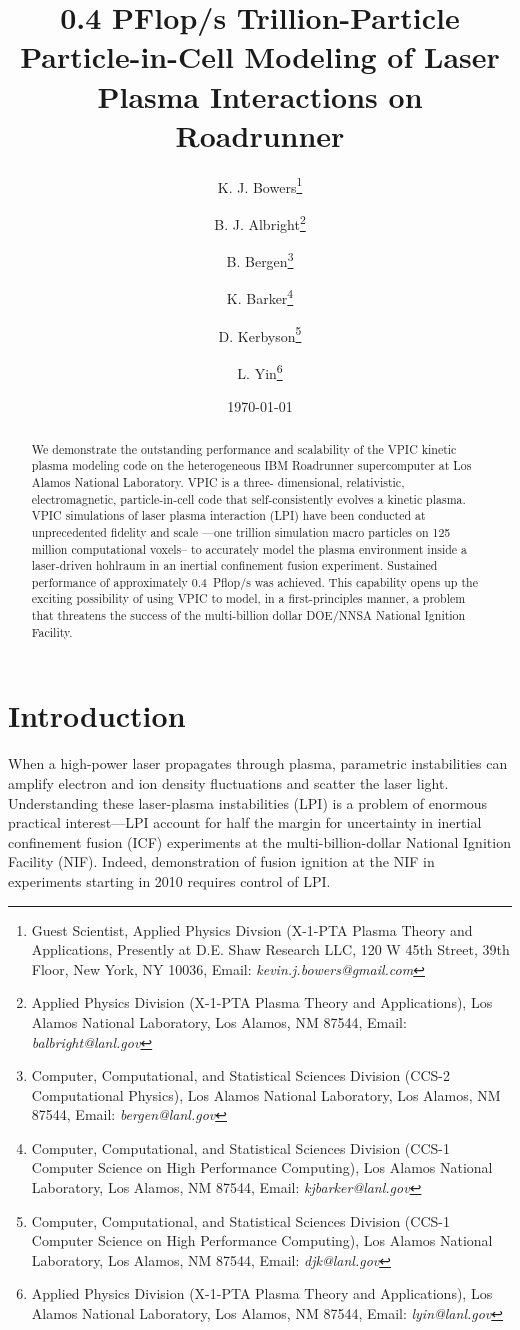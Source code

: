 \documentclass[10pt]{article}
\title{0.4 PFlop/s Trillion-Particle Particle-in-Cell Modeling of Laser Plasma Interactions on Roadrunner}
\author{%
K. J. Bowers\thanks{Guest Scientist, Applied Physics Divsion (X-1-PTA Plasma Theory and Applications, Presently at D.E. Shaw Research LLC, 120 W 45th Street, 39th Floor, New York, NY 10036, Email: \emph{kevin.j.bowers@gmail.com}} \and%
%
B. J. Albright\thanks{Applied Physics Division (X-1-PTA Plasma Theory and Applications), Los Alamos National Laboratory, Los Alamos, NM 87544, Email: \emph{balbright@lanl.gov}} \and%
%
B. Bergen\thanks{Computer, Computational, and Statistical Sciences Division (CCS-2 Computational Physics), Los Alamos National Laboratory, Los Alamos, NM 87544, Email: \emph{bergen@lanl.gov}} \and%
%
K. Barker\thanks{Computer, Computational, and Statistical Sciences Division (CCS-1 Computer Science on High Performance Computing), Los Alamos National Laboratory, Los Alamos, NM 87544, Email: \emph{kjbarker@lanl.gov}} \and%
%
D. Kerbyson\thanks{Computer, Computational, and Statistical Sciences Division (CCS-1 Computer Science on High Performance Computing), Los Alamos National Laboratory, Los Alamos, NM 87544, Email: \emph{djk@lanl.gov}} \and%
%
L. Yin\thanks{Applied Physics Division (X-1-PTA Plasma Theory and Applications), Los Alamos National Laboratory, Los Alamos, NM 87544, Email: \emph{lyin@lanl.gov}}}
\date{\today}
\begin{document}
\maketitle
\thispagestyle{empty}

\begin{singlespace}
\begin{abstract}
We demonstrate the outstanding performance and scalability of the VPIC
kinetic plasma modeling code on the heterogeneous IBM Roadrunner
supercomputer at Los Alamos National Laboratory.  VPIC is a three-
dimensional, relativistic, electromagnetic, particle-in-cell code that
self-consistently evolves a kinetic plasma.  VPIC simulations of laser
plasma interaction (LPI) have been conducted at unprecedented fidelity
and scale ---one trillion simulation macro particles on 125 million
computational voxels-- to accurately model the plasma environment
inside a laser-driven hohlraum in an inertial confinement fusion
experiment.  Sustained performance of approximately 0.4~Pflop/s was
achieved.  This capability opens up the exciting possibility of using
VPIC to model, in a first-principles manner, a problem that threatens
the success of the multi-billion dollar DOE/NNSA National Ignition
Facility.
\end{abstract}
\end{singlespace}

\pagebreak

\section*{Introduction}

When a high-power laser propagates through plasma, parametric
instabilities can amplify electron and ion density fluctuations and
scatter the laser light.  Understanding these laser-plasma
instabilities (LPI) is a problem of enormous practical interest---LPI
account for half the margin for uncertainty in inertial confinement
fusion (ICF) experiments at the multi-billion-dollar National Ignition
Facility (NIF).  Indeed, demonstration of fusion ignition at the NIF
in experiments starting in 2010 requires control of LPI.
\end{document}
